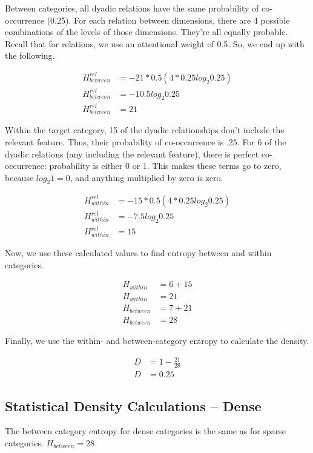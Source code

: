 \documentclass[../dissertation.tex]{subfiles}
\begin{document}
Between categories, all dyadic relations have the same probability of co-occurrence (0.25). For each relation between dimensions, there are 4 possible combinations of the levels of those dimensions. They're all equally probable. Recall that for relations, we use an attentional weight of 0.5. So, we end up with the following.

\begin{align*}
H^{rel}_{between} &= -21 * 0.5(4 * 0.25log_{2}0.25)\\
H^{rel}_{between} &= -10.5log_{2}0.25\\
H^{rel}_{between} &= 21
\end{align*}

Within the target category, 15 of the dyadic relationships don't include the relevant feature. Thus, their probability of co-occurrence is .25. For 6 of the dyadic relations (any including the relevant feature), there is perfect co-occurrence: probability is either 0 or 1. This makes these terms go to zero, because $log_{2}1 = 0$, and anything multiplied by zero is zero.

\begin{align*}
H^{rel}_{within} &= -15 * 0.5(4 * 0.25log_{2}0.25)\\
H^{rel}_{within} &= -7.5log_{2}0.25\\
H^{rel}_{within} &= 15
\end{align*}

Now, we use these calculated values to find entropy between and within categories.

\begin{align*}
H_{within} &= 6 + 15\\
H_{within} &= 21\\
H_{between} &= 7 + 21\\
H_{between} &= 28
\end{align*}

Finally, we use the within- and between-category entropy to calculate the density.

\begin{align*}
D &= 1 - \frac{21}{28}\\
D &= 0.25
\end{align*}

\subsection{Statistical Density Calculations -- Dense}

The between category entropy for dense categories is the same as for sparse categories. $H_{between} = 28$ \newline
\end{document}
